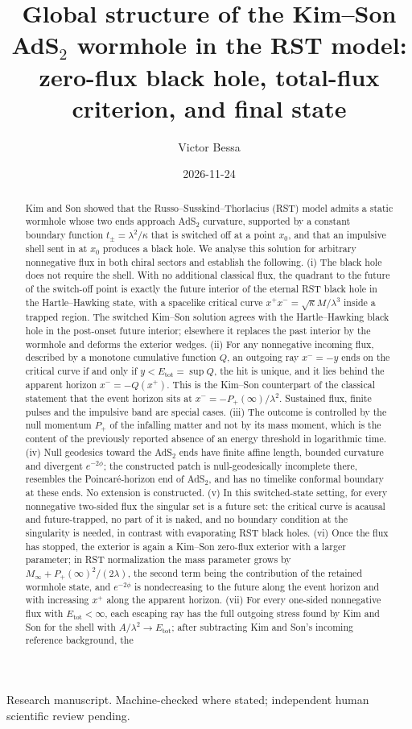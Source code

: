 \documentclass[11pt]{article}
\title{Global structure of the Kim--Son AdS$_2$ wormhole in the RST model:\\
zero-flux black hole, total-flux criterion, and final state}
\author{Victor Bessa}
\date{2026-11-24}
\theoremstyle{remark}
\newcommand{\Etot}{E_{\mathrm{tot}}}
\begin{document}
\maketitle
\begin{center}\small Research manuscript. Machine-checked where stated; independent human scientific review pending.\end{center}

\begin{abstract}
Kim and Son showed that the Russo--Susskind--Thorlacius (RST) model admits a static wormhole whose two ends approach AdS$_2$ curvature, supported by a constant boundary function $t_\pm=\lambda^2/\kappa$ that is switched off at a point $x_0$, and that an impulsive shell sent in at $x_0$ produces a black hole. We analyse this solution for arbitrary nonnegative flux in both chiral sectors and establish the following. (i) The black hole does not require the shell. With no additional classical flux, the quadrant to the future of the switch-off point is exactly the future interior of the eternal RST black hole in the Hartle--Hawking state, with a spacelike critical curve $x^+x^-=\sqrt\kappa M/\lambda^3$ inside a trapped region. The switched Kim--Son solution agrees with the Hartle--Hawking black hole in the post-onset future interior; elsewhere it replaces the past interior by the wormhole and deforms the exterior wedges. (ii) For any nonnegative incoming flux, described by a monotone cumulative function $Q$, an outgoing ray $x^-=-y$ ends on the critical curve if and only if $y<\Etot=\sup Q$, the hit is unique, and it lies behind the apparent horizon $x^-=-Q(x^+)$. This is the Kim--Son counterpart of the classical statement that the event horizon sits at $x^-=-P_+(\infty)/\lambda^2$. Sustained flux, finite pulses and the impulsive band are special cases. (iii) The outcome is controlled by the null momentum $P_+$ of the infalling matter and not by its mass moment, which is the content of the previously reported absence of an energy threshold in logarithmic time. (iv) Null geodesics toward the AdS$_2$ ends have finite affine length, bounded curvature and divergent $e^{-2\phi}$; the constructed patch is null-geodesically incomplete there, resembles the Poincar\'e-horizon end of AdS$_2$, and has no timelike conformal boundary at these ends. No extension is constructed. (v) In this switched-state setting, for every nonnegative two-sided flux the singular set is a future set: the critical curve is acausal and future-trapped, no part of it is naked, and no boundary condition at the singularity is needed, in contrast with evaporating RST black holes. (vi) Once the flux has stopped, the exterior is again a Kim--Son zero-flux exterior with a larger parameter; in RST normalization the mass parameter grows by $M_\infty+P_+(\infty)^2/(2\lambda)$, the second term being the contribution of the retained wormhole state, and $e^{-2\phi}$ is nondecreasing to the future along the event horizon and with increasing $x^+$ along the apparent horizon. (vii) For every one-sided nonnegative flux with $\Etot<\infty$, each escaping ray has the full outgoing stress found by Kim and Son for the shell with $A/\lambda^2\to\Etot$; after subtracting Kim and Son's incoming reference background, the 
\end{abstract}
\end{document}
